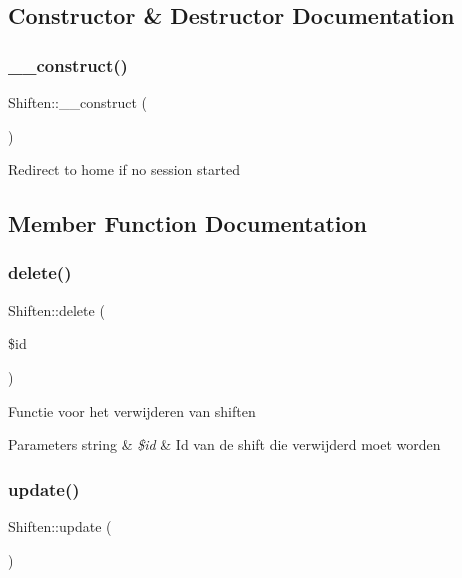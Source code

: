 \subsection{Constructor \& Destructor Documentation}
\mbox{\label{class_shiften_ab8a8594268fd644b65cbc27698fd94f4}} 
\subsubsection{\texorpdfstring{\+\_\+\+\_\+construct()}{\_\_construct()}}
{\footnotesize\ttfamily Shiften\+::\+\_\+\+\_\+construct (\begin{DoxyParamCaption}{ }\end{DoxyParamCaption})}

Redirect to home if no session started 

\subsection{Member Function Documentation}
\mbox{\label{class_shiften_a68ff1255b0af39c545eae586c3fac0b8}} 
\subsubsection{\texorpdfstring{delete()}{delete()}}
{\footnotesize\ttfamily Shiften\+::delete (\begin{DoxyParamCaption}\item[{}]{\$id }\end{DoxyParamCaption})}

Functie voor het verwijderen van shiften 
\begin{DoxyParams}[1]{Parameters}
string & {\em \$id} & Id van de shift die verwijderd moet worden \\
\hline
\end{DoxyParams}
\mbox{\label{class_shiften_af783a05fca5d9fe438122482ce10ded8}} 
\subsubsection{\texorpdfstring{update()}{update()}}
{\footnotesize\ttfamily Shiften\+::update (\begin{DoxyParamCaption}{ }\end{DoxyParamCaption})}



